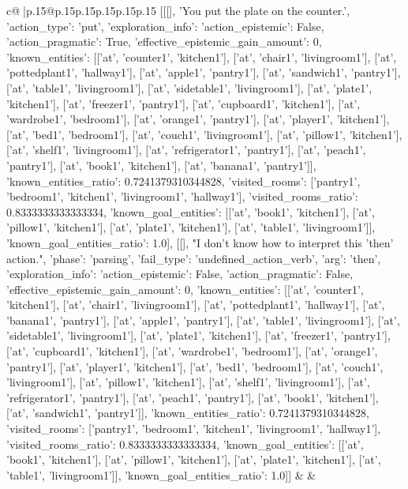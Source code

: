 \documentclass{article}
\begin{document}
{\begin{supertabular}{c@{$\;$}|p{.15\linewidth}@{}p{.15\linewidth}p{.15\linewidth}p{.15\linewidth}p{.15\linewidth}p{.15\linewidth}}
{{{	 [[[], 'You put the plate on the counter.', {'action_type': 'put', 'exploration_info': {'action_epistemic': False, 'action_pragmatic': True, 'effective_epistemic_gain_amount': 0, 'known_entities': [['at', 'counter1', 'kitchen1'], ['at', 'chair1', 'livingroom1'], ['at', 'pottedplant1', 'hallway1'], ['at', 'apple1', 'pantry1'], ['at', 'sandwich1', 'pantry1'], ['at', 'table1', 'livingroom1'], ['at', 'sidetable1', 'livingroom1'], ['at', 'plate1', 'kitchen1'], ['at', 'freezer1', 'pantry1'], ['at', 'cupboard1', 'kitchen1'], ['at', 'wardrobe1', 'bedroom1'], ['at', 'orange1', 'pantry1'], ['at', 'player1', 'kitchen1'], ['at', 'bed1', 'bedroom1'], ['at', 'couch1', 'livingroom1'], ['at', 'pillow1', 'kitchen1'], ['at', 'shelf1', 'livingroom1'], ['at', 'refrigerator1', 'pantry1'], ['at', 'peach1', 'pantry1'], ['at', 'book1', 'kitchen1'], ['at', 'banana1', 'pantry1']], 'known_entities_ratio': 0.7241379310344828, 'visited_rooms': ['pantry1', 'bedroom1', 'kitchen1', 'livingroom1', 'hallway1'], 'visited_rooms_ratio': 0.8333333333333334, 'known_goal_entities': [['at', 'book1', 'kitchen1'], ['at', 'pillow1', 'kitchen1'], ['at', 'plate1', 'kitchen1'], ['at', 'table1', 'livingroom1']], 'known_goal_entities_ratio': 1.0}}], [[], "I don't know how to interpret this 'then' action.", {'phase': 'parsing', 'fail_type': 'undefined_action_verb', 'arg': 'then', 'exploration_info': {'action_epistemic': False, 'action_pragmatic': False, 'effective_epistemic_gain_amount': 0, 'known_entities': [['at', 'counter1', 'kitchen1'], ['at', 'chair1', 'livingroom1'], ['at', 'pottedplant1', 'hallway1'], ['at', 'banana1', 'pantry1'], ['at', 'apple1', 'pantry1'], ['at', 'table1', 'livingroom1'], ['at', 'sidetable1', 'livingroom1'], ['at', 'plate1', 'kitchen1'], ['at', 'freezer1', 'pantry1'], ['at', 'cupboard1', 'kitchen1'], ['at', 'wardrobe1', 'bedroom1'], ['at', 'orange1', 'pantry1'], ['at', 'player1', 'kitchen1'], ['at', 'bed1', 'bedroom1'], ['at', 'couch1', 'livingroom1'], ['at', 'pillow1', 'kitchen1'], ['at', 'shelf1', 'livingroom1'], ['at', 'refrigerator1', 'pantry1'], ['at', 'peach1', 'pantry1'], ['at', 'book1', 'kitchen1'], ['at', 'sandwich1', 'pantry1']], 'known_entities_ratio': 0.7241379310344828, 'visited_rooms': ['pantry1', 'bedroom1', 'kitchen1', 'livingroom1', 'hallway1'], 'visited_rooms_ratio': 0.8333333333333334, 'known_goal_entities': [['at', 'book1', 'kitchen1'], ['at', 'pillow1', 'kitchen1'], ['at', 'plate1', 'kitchen1'], ['at', 'table1', 'livingroom1']], 'known_goal_entities_ratio': 1.0}}]] 
	  } 
	   } 
	   } 
	 & & \\ 
 


\end{supertabular}}
\end{document}
